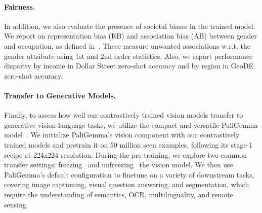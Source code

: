 \paragraph{Fairness.}
In addition, we also evaluate the presence of societal biases in the trained model. We report on representation bias (RB) and association bias (AB) between gender and occupation, as defined in~\citet{alabdulmohsin2024clip}. These measure unwanted associations w.r.t. the gender attribute using 1st and 2nd order statistics. Also, we report performance disparity by income in Dollar Street zero-shot accuracy and by region in GeoDE zero-shot accuracy.%

\paragraph{Transfer to Generative Models.}
Finally, to assess how well our contrastively trained vision models transfer to generative vision-language tasks, we utilize the compact and versatile PaliGemma model~\citep{beyer2024paligemma}. We initialize PaliGemma's vision component with our contrastively trained models and pretrain it on 50 million seen examples, following its stage-1 recipe at 224x224 resolution. During the pre-training, we explore two common transfer settings: freezing~\citep{liu2024visual,zhu2023minigpt,chen2022pali} and unfreezing~\citep{xiao2024florence,chen2023pali,beyer2024paligemma,steiner2024paligemma2familyversatile} the vision model. We then use PaliGemma's default configuration to finetune on a variety of downstream tasks, covering image captioning, visual question answering, and segmentation, which require the understanding of  semantics, OCR, multilinguality, and remote sensing.